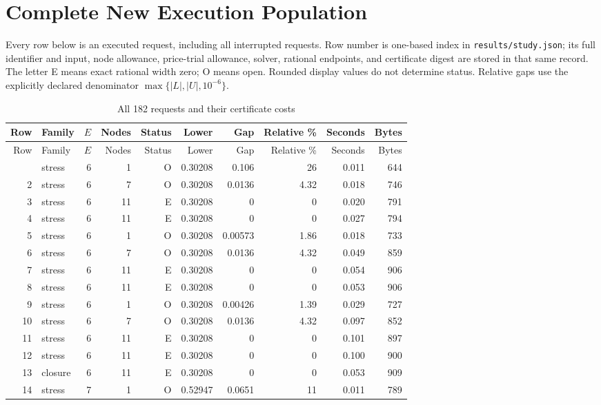 \section{Complete New Execution Population}\label{sec:r51-all-runs}
Every row below is an executed request, including all interrupted requests. Row number is one-based index in \texttt{results/study.json}; its full identifier and input, node allowance, price-trial allowance, solver, rational endpoints, and certificate digest are stored in that same record. The letter E means exact rational width zero; O means open. Rounded display values do not determine status. Relative gaps use the explicitly declared denominator $\max\{|L|,|U|,10^{-6}\}$.
\begingroup\small\setlength{\tabcolsep}{3pt}
\begin{longtable}{rlrrrrrrrr}
\caption{All 182 requests and their certificate costs}\label{tab:r51-all}\\
\toprule
Row & Family & $E$ & Nodes & Status & Lower & Gap & Relative \% & Seconds & Bytes\\\midrule\endfirsthead
\toprule Row & Family & $E$ & Nodes & Status & Lower & Gap & Relative \% & Seconds & Bytes\\\midrule\endhead
\bottomrule\endfoot
1 & stress & 6 & 1 & O & 0.30208 & 0.106 & 26 & 0.011 & 644 \\
2 & stress & 6 & 7 & O & 0.30208 & 0.0136 & 4.32 & 0.018 & 746 \\
3 & stress & 6 & 11 & E & 0.30208 & 0 & 0 & 0.020 & 791 \\
4 & stress & 6 & 11 & E & 0.30208 & 0 & 0 & 0.027 & 794 \\
5 & stress & 6 & 1 & O & 0.30208 & 0.00573 & 1.86 & 0.018 & 733 \\
6 & stress & 6 & 7 & O & 0.30208 & 0.0136 & 4.32 & 0.049 & 859 \\
7 & stress & 6 & 11 & E & 0.30208 & 0 & 0 & 0.054 & 906 \\
8 & stress & 6 & 11 & E & 0.30208 & 0 & 0 & 0.053 & 906 \\
9 & stress & 6 & 1 & O & 0.30208 & 0.00426 & 1.39 & 0.029 & 727 \\
10 & stress & 6 & 7 & O & 0.30208 & 0.0136 & 4.32 & 0.097 & 852 \\
11 & stress & 6 & 11 & E & 0.30208 & 0 & 0 & 0.101 & 897 \\
12 & stress & 6 & 11 & E & 0.30208 & 0 & 0 & 0.100 & 900 \\
13 & closure & 6 & 11 & E & 0.30208 & 0 & 0 & 0.053 & 909 \\
14 & stress & 7 & 1 & O & 0.52947 & 0.0651 & 11 & 0.011 & 789 \\

\end{longtable}

